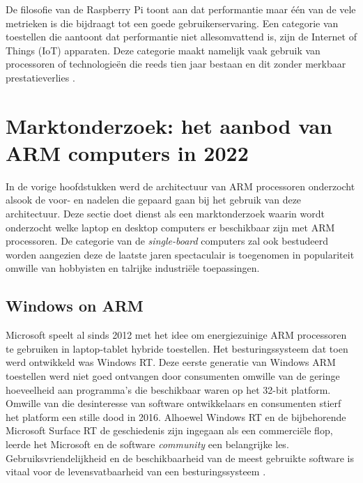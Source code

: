 De filosofie van de Raspberry Pi toont aan dat performantie maar één van de vele metrieken is die bijdraagt tot een goede gebruikerservaring. Een categorie van toestellen die aantoont dat performantie niet allesomvattend is, zijn de Internet of Things (IoT) apparaten. Deze categorie maakt namelijk vaak gebruik van processoren of technologieën die reeds tien jaar bestaan en dit zonder merkbaar prestatieverlies \autocite{Aitken2019}. 

\section{Marktonderzoek: het aanbod van ARM computers in 2022}
In de vorige hoofdstukken werd de architectuur van ARM processoren onderzocht alsook de voor- en nadelen die gepaard gaan bij het gebruik van deze architectuur. Deze sectie doet dienst als een marktonderzoek waarin wordt onderzocht welke laptop en desktop computers er beschikbaar zijn met ARM processoren. De categorie van de \textit{single-board} computers zal ook bestudeerd worden aangezien deze de laatste jaren spectaculair is toegenomen in populariteit omwille van hobbyisten en talrijke industriële toepassingen.

\subsection{Windows on ARM}
Microsoft speelt al sinds 2012 met het idee om energiezuinige ARM processoren te gebruiken in laptop-tablet hybride toestellen. Het besturingssysteem dat toen werd ontwikkeld was Windows RT. Deze eerste generatie van Windows ARM toestellen werd niet goed ontvangen door consumenten omwille van de geringe hoeveelheid aan programma's die beschikbaar waren op het 32-bit platform. Omwille van die desinteresse van software ontwikkelaars en consumenten stierf het platform een stille dood in 2016. Alhoewel Windows RT en de bijbehorende Microsoft Surface RT de geschiedenis zijn ingegaan als een commerciële flop, leerde het Microsoft en de software \textit{community} een belangrijke les. Gebruiksvriendelijkheid en de beschikbaarheid van de meest gebruikte software is vitaal voor de levensvatbaarheid van een besturingssysteem \autocite{Triggs2022}. 

